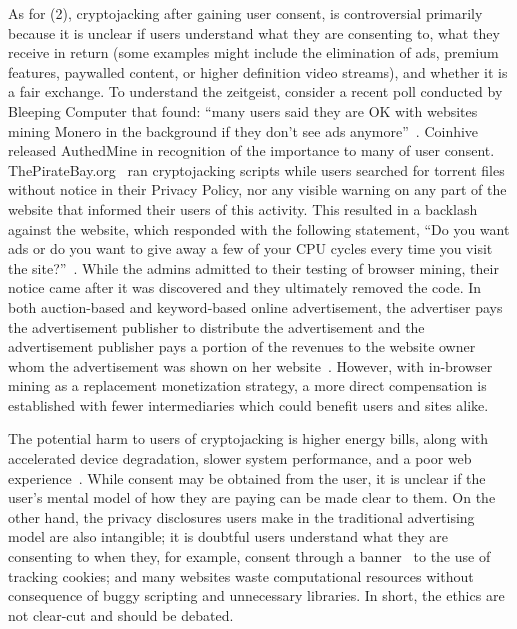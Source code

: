 As for (2), cryptojacking after gaining user consent, is controversial primarily because it is unclear if users understand what they are consenting to, what they receive in return (some examples might include the elimination of ads, premium features, paywalled content, or higher definition video streams), and whether it is a fair exchange. To understand the zeitgeist, consider a recent poll conducted by Bleeping Computer that found: ``many users said they are OK with websites mining Monero in the background if they don't see ads anymore''~\cite{bleepingcomputerminers}. Coinhive released AuthedMine in recognition of the importance to many of user consent. ThePirateBay.org~\cite{bbcmintcrypto} ran cryptojacking scripts while users searched for torrent files without notice in their Privacy Policy, nor any visible warning on any part of the website that informed their users of this activity. This resulted in a backlash against the website, which responded with the following statement, ``Do you want ads or do you want to give away a few of your CPU cycles every time you visit the site?''~\cite{piratesbayblog}. While the admins admitted to their testing of browser mining, their notice came after it was discovered and they ultimately removed the code. In both auction-based and keyword-based online advertisement, the advertiser pays the advertisement publisher to distribute the advertisement and the advertisement publisher pays a portion of the revenues to the website owner whom the advertisement was shown on her website~\cite{king2007internet}. However, with in-browser mining as a replacement monetization strategy, a more direct compensation is established with fewer intermediaries which could benefit users and sites alike. 

The potential harm to users of cryptojacking is higher energy bills, along with accelerated device degradation, slower system performance, and a poor web experience~\cite{httparchiveminingimpact,gaurdianelectricity}. While consent may be obtained from the user, it is unclear if the user's mental model of how they are paying can be made clear to them. On the other hand, the privacy disclosures users make in the traditional advertising model are also intangible; it is doubtful users understand what they are consenting to when they, for example, consent through a banner~\cite{eucookie} to the use of tracking cookies; and many websites waste computational resources without consequence of buggy scripting and unnecessary libraries. In short, the ethics are not clear-cut and should be debated. 

